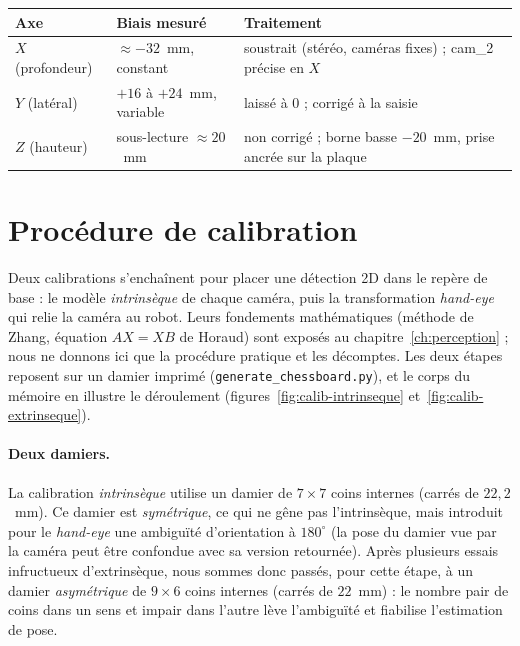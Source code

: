 \medskip
\begin{center}
  \small
  \begin{tabularx}{\linewidth}{l X X}
    \toprule
    Axe & Biais mesuré & Traitement \\
    \midrule
    $X$ (profondeur) & $\approx -32$~mm, constant & soustrait (stéréo, caméras fixes) ; cam\_2 précise en $X$ \\
    $Y$ (latéral) & $+16$ à $+24$~mm, variable & laissé à 0 ; corrigé à la saisie \\
    $Z$ (hauteur) & sous-lecture $\approx 20$~mm & non corrigé ; borne basse $-20$~mm, prise ancrée sur la plaque \\
    \bottomrule
  \end{tabularx}
  \label{tab:biais}
\end{center}
\medskip

\section{Procédure de calibration}
\label{sec:ann-calib}

Deux calibrations s'enchaînent pour placer une détection 2D dans le repère de base : le modèle \emph{intrinsèque} de chaque caméra, puis la transformation \emph{hand-eye} qui relie la caméra au robot. Leurs fondements mathématiques (méthode de Zhang, équation $AX=XB$ de Horaud) sont exposés au chapitre~\ref{ch:perception} ; nous ne donnons ici que la procédure pratique et les décomptes. Les deux étapes reposent sur un damier imprimé (\texttt{generate\_chessboard.py}), et le corps du mémoire en illustre le déroulement (figures~\ref{fig:calib-intrinseque} et~\ref{fig:calib-extrinseque}).

\paragraph{Deux damiers.} La calibration \emph{intrinsèque} utilise un damier de $7\times7$ coins internes (carrés de $22{,}2$~mm). Ce damier est \emph{symétrique}, ce qui ne gêne pas l'intrinsèque, mais introduit pour le \emph{hand-eye} une ambiguïté d'orientation à $180^\circ$ (la pose du damier vue par la caméra peut être confondue avec sa version retournée). Après plusieurs essais infructueux d'extrinsèque, nous sommes donc passés, pour cette étape, à un damier \emph{asymétrique} de $9\times6$ coins internes (carrés de $22$~mm) : le nombre pair de coins dans un sens et impair dans l'autre lève l'ambiguïté et fiabilise l'estimation de pose.

